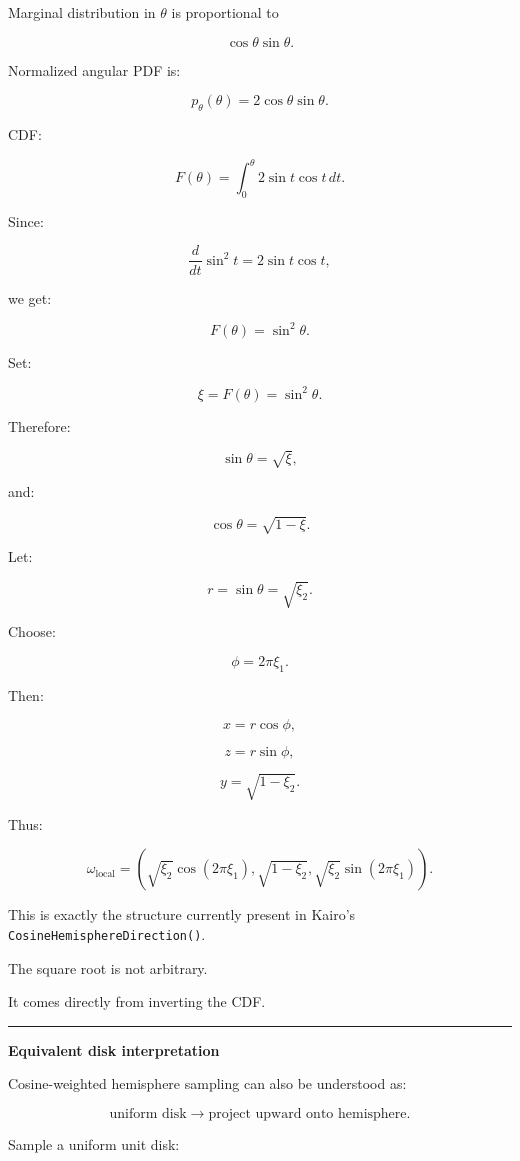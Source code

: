 Marginal distribution in \(\theta\) is proportional to

\[
\cos\theta\sin\theta.
\]

Normalized angular PDF is:

\[
p_\theta(\theta)
=
2\cos\theta\sin\theta.
\]

CDF:

\[
F(\theta)
=
\int_0^\theta
2\sin t\cos t\,dt.
\]

Since:

\[
\frac{d}{dt}\sin^2t
=
2\sin t\cos t,
\]

we get:

\[
\boxed{
F(\theta)
=
\sin^2\theta.
}
\]

Set:

\[
\xi=F(\theta)
=
\sin^2\theta.
\]

Therefore:

\[
\sin\theta
=
\sqrt{\xi},
\]

and:

\[
\cos\theta
=
\sqrt{1-\xi}.
\]

Let:

\[
r=\sin\theta=\sqrt{\xi_2}.
\]

Choose:

\[
\phi=2\pi\xi_1.
\]

Then:

\[
x=r\cos\phi,
\]

\[
z=r\sin\phi,
\]

\[
y=\sqrt{1-\xi_2}.
\]

Thus:

\[
\boxed{
\omega_{\text{local}}
=
\left(
\sqrt{\xi_2}\cos(2\pi\xi_1),
\sqrt{1-\xi_2},
\sqrt{\xi_2}\sin(2\pi\xi_1)
\right).
}
\]

This is exactly the structure currently present in Kairo's \texttt{CosineHemisphereDirection()}.

The square root is not arbitrary.

It comes directly from inverting the CDF.

\begin{center}\rule{0.5\linewidth}{0.5pt}\end{center}

\textbf{Equivalent disk interpretation}

Cosine-weighted hemisphere sampling can also be understood as:

\[
\text{uniform disk}
\rightarrow
\text{project upward onto hemisphere}.
\]

Sample a uniform unit disk:

